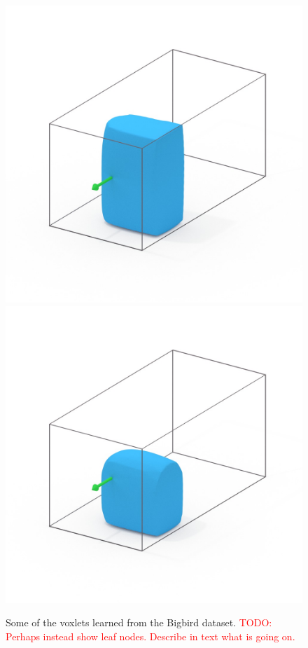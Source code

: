 \documentclass[10pt,twocolumn,letterpaper]{article}
\newcommand{\todo}[1]{\textcolor{red}{TODO: #1}}
\begin{document}
\begin{figure}
     \includegraphics[width=0.32\columnwidth, clip=true, trim=130 150 120 150]{data/all_voxlets_renders_white/38_marching_cubes.jpg}
     \includegraphics[width=0.32\columnwidth, clip=true, trim=130 150 120 150]{data/all_voxlets_renders_white/44_marching_cubes.jpg}
     \caption{Some of the voxlets learned from the Bigbird dataset. \todo{Perhaps instead show leaf nodes. Describe in text what is going on.}}
\end{figure}


\newcommand\objone[1]{%
}
\end{document}
